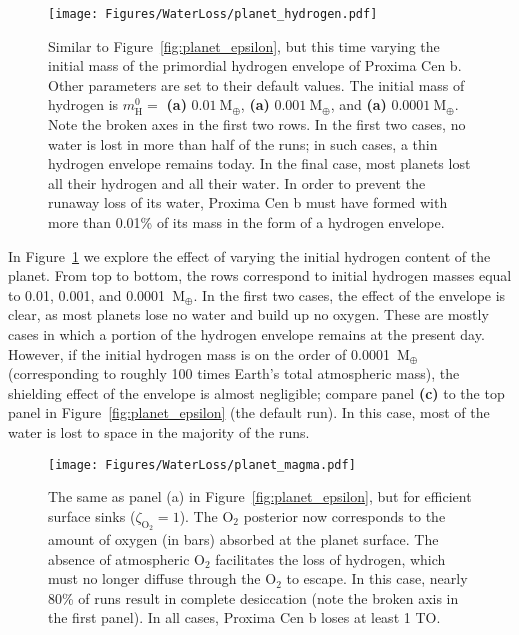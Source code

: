 \documentclass[preprint,12pt]{aastex}
\begin{document}
\begin{figure}[ht]
 \begin{center}
     \texttt{[image: Figures/WaterLoss/planet\_hydrogen.pdf]}
      \caption{Similar to Figure~\ref{fig:planet_epsilon}, but this time varying the initial mass of the primordial
      hydrogen envelope of Proxima Cen b. Other parameters are set to their default values. The initial mass of hydrogen
      is $m_\mathrm{H}^0 =$ \textbf{(a)} $0.01\ \mathrm{M_\oplus}$, \textbf{(a)} $0.001\ \mathrm{M_\oplus}$, and
      \textbf{(a)} $0.0001\ \mathrm{M_\oplus}$. Note the broken axes in the first two rows. In the first two cases,
      no water is lost in more than half of the runs; in such cases, a thin hydrogen envelope remains today. In the
      final case, most planets lost all their hydrogen and all their water. In order to prevent the runaway loss
      of its water, Proxima Cen b must have formed with more than 0.01\% of its mass in the form of a hydrogen envelope.
      }
    \label{fig:planet_hydrogen}
 \end{center}
\end{figure}

In Figure~\ref{fig:planet_hydrogen} we explore the effect of varying the initial hydrogen content of the planet.
From top to bottom, the rows correspond to initial hydrogen masses equal to 0.01, 0.001, and 0.0001~$\mathrm{M_\oplus}$.
In the first two cases, the effect of the envelope is clear, as most planets lose no water and build up no oxygen.
These are mostly cases in which a portion of the hydrogen envelope remains at the present day. However, if the
initial hydrogen mass is on the order of 0.0001~$\mathrm{M_\oplus}$ (corresponding to roughly 100 times Earth's
total atmospheric mass), the shielding effect of the envelope is 
almost negligible; compare panel \textbf{(c)} to the top panel in Figure~\ref{fig:planet_epsilon} (the default run).
In this case, most of the water is lost to space in the majority of the runs.

\begin{figure}[ht]
\begin{center}
    \texttt{[image: Figures/WaterLoss/planet\_magma.pdf]}
     \caption{The same as panel (a) in Figure~\ref{fig:planet_epsilon}, but for efficient surface sinks
     ($\zeta_\mathrm{O_2} = 1$). The O$_2$ posterior now corresponds to the amount of oxygen (in bars) absorbed
     at the planet surface. The absence of atmospheric O$_2$ facilitates the loss of hydrogen, which must
     no longer diffuse through the O$_2$ to escape. In this case, nearly 80\% of runs result in complete desiccation
     (note the broken axis in the first panel). In all cases, Proxima Cen b loses at least 1 TO.}
   \label{fig:planet_magma}
\end{center}
\end{figure}
\end{document}
